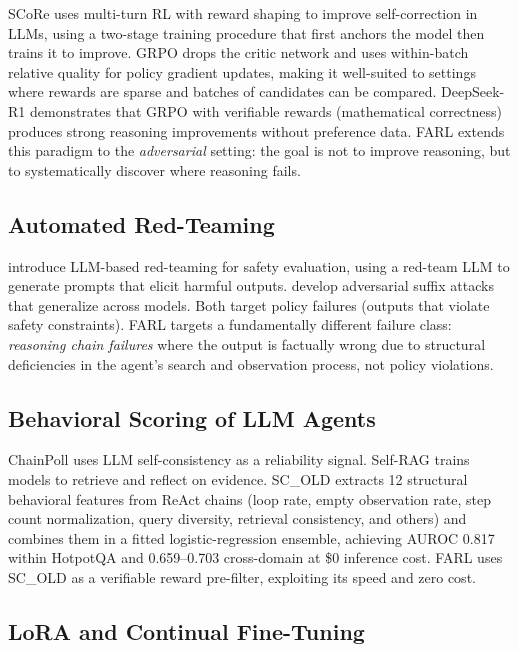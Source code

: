 \documentclass[11pt,a4paper]{article}
\begin{document}
SCoRe \cite{kumar2025score} uses multi-turn RL with reward shaping to improve
self-correction in LLMs, using a two-stage training procedure that first anchors
the model then trains it to improve. GRPO \cite{shao2024deepseekmath} drops the
critic network and uses within-batch relative quality for policy gradient
updates, making it well-suited to settings where rewards are sparse and batches
of candidates can be compared. DeepSeek-R1 \cite{deepseek2025r1} demonstrates
that GRPO with verifiable rewards (mathematical correctness) produces strong
reasoning improvements without preference data. FARL extends this paradigm to
the \emph{adversarial} setting: the goal is not to improve reasoning, but to
systematically discover where reasoning fails.

\subsection{Automated Red-Teaming}

\cite{perez2022redteaming} introduce LLM-based red-teaming for safety
evaluation, using a red-team LLM to generate prompts that elicit harmful
outputs. \cite{zou2023universal} develop adversarial suffix attacks that
generalize across models. Both target policy failures (outputs that violate
safety constraints). FARL targets a fundamentally different failure class:
\emph{reasoning chain failures} where the output is factually wrong due to
structural deficiencies in the agent's search and observation process, not
policy violations.

\subsection{Behavioral Scoring of LLM Agents}

ChainPoll \cite{friel2023chainpoll} uses LLM self-consistency as a reliability
signal. Self-RAG \cite{asai2023selfrag} trains models to retrieve and reflect
on evidence. SC\_OLD \cite{qppg2025} extracts 12 structural behavioral features
from ReAct chains (loop rate, empty observation rate, step count normalization,
query diversity, retrieval consistency, and others) and combines them in a
fitted logistic-regression ensemble, achieving AUROC 0.817 within HotpotQA
and 0.659--0.703 cross-domain at \$0 inference cost. FARL uses SC\_OLD as
a verifiable reward pre-filter, exploiting its speed and zero cost.

\subsection{LoRA and Continual Fine-Tuning}
\end{document}
